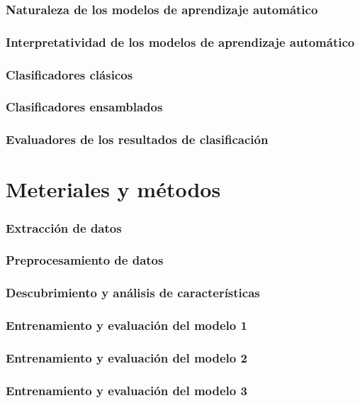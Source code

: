 \documentclass{article}
\theoremstyle{mytheoremstyle}
\theoremstyle{mytheoremstyle}
\theoremstyle{myproblemstyle}
\begin{document}
    \subsubsection{Naturaleza de los modelos de aprendizaje automático}
    \subsubsection{Interpretatividad de los modelos de aprendizaje automático}
    \subsubsection{Clasificadores clásicos}
    \subsubsection{Clasificadores ensamblados}
    \subsubsection{Evaluadores de los resultados de clasificación}

    
    

    \section{Meteriales y métodos}
    \subsubsection{Extracción de datos}
    \subsubsection{Preprocesamiento de datos}
    \subsubsection{Descubrimiento y análisis de características}
    \subsubsection{Entrenamiento y evaluación del modelo 1}
    \subsubsection{Entrenamiento y evaluación del modelo 2}
    \subsubsection{Entrenamiento y evaluación del modelo 3}
\end{document}
